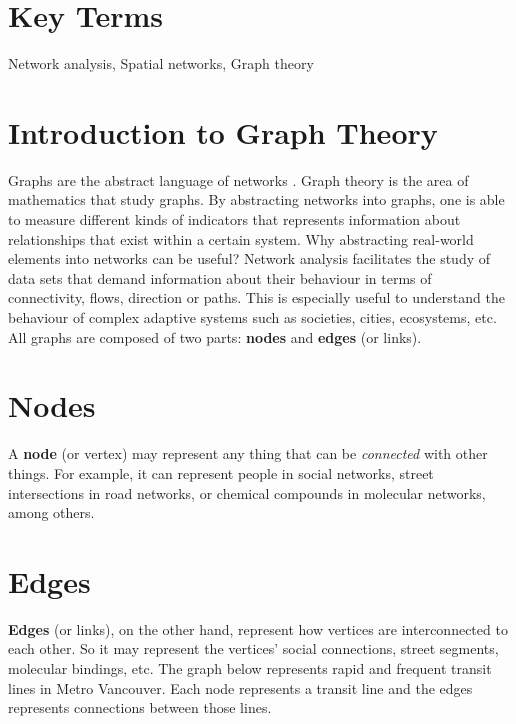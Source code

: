\documentclass[
]{book}
\begin{document}
\section*{Key Terms}\label{key-terms-6}

Network analysis, Spatial networks, Graph theory

\section{Introduction to Graph Theory}\label{introduction-to-graph-theory}

Graphs are the abstract language of networks \citep{systems_innovation_graph_2015}. Graph theory is the area of mathematics that study graphs. By abstracting networks into graphs, one is able to measure different kinds of indicators that represents information about relationships that exist within a certain system. Why abstracting real-world elements into networks can be useful? Network analysis facilitates the study of data sets that demand information about their behaviour in terms of connectivity, flows, direction or paths. This is especially useful to understand the behaviour of complex adaptive systems such as societies, cities, ecosystems, etc. All graphs are composed of two parts: \textbf{nodes} and \textbf{edges} (or links).

\section{Nodes}\label{nodes}

A \textbf{node} (or vertex) may represent any thing that can be \emph{connected} with other things. For example, it can represent people in social networks, street intersections in road networks, or chemical compounds in molecular networks, among others.

\section{Edges}\label{edges}

\textbf{Edges} (or links), on the other hand, represent how vertices are interconnected to each other. So it may represent the vertices' social connections, street segments, molecular bindings, etc. The graph below represents rapid and frequent transit lines in Metro Vancouver. Each node represents a transit line and the edges represents connections between those lines.
\end{document}
